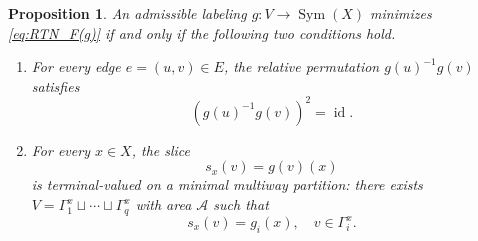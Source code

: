 \documentclass[11pt,oneside,letterpaper]{article}
\numberwithin{equation}{section}
\newtheorem{proposition}[theorem]{Proposition}
\theoremstyle{definition}
\theoremstyle{remark}
\DeclareMathOperator{\id}{id}
\DeclareMathOperator{\Sym}{Sym}
\begin{document}
\begin{proposition}
  \label{prop:counting-equality-conditions}
  An admissible labeling $g:V\to \Sym(X)$ minimizes \eqref{eq:RTN_F(g)} if
  and only if the following two conditions hold.
  \begin{enumerate}[label=(\arabic*)]
  \item \label{item:counting-edge-involution}
    For every edge $e=(u,v)\in E$, the relative permutation
    $g(u)^{-1}g(v)$ satisfies
    \begin{equation}
      (g(u)^{-1}g(v))^2=\id.
    \end{equation}

  \item \label{item:counting-slice-mincut}
    For every $x\in X$, the slice
    \begin{equation}
      s_x(v)=g(v)(x)
    \end{equation}
    is terminal-valued on a minimal multiway partition: there exists
    $V=\Gamma_1^x\sqcup\cdots\sqcup\Gamma_q^x$ with area $\mathcal{A}$
    such that
    \begin{equation}
      s_x(v)=g_i(x),\quad v\in\Gamma_i^x.
    \end{equation}
  \end{enumerate}
\end{proposition}
\end{document}
